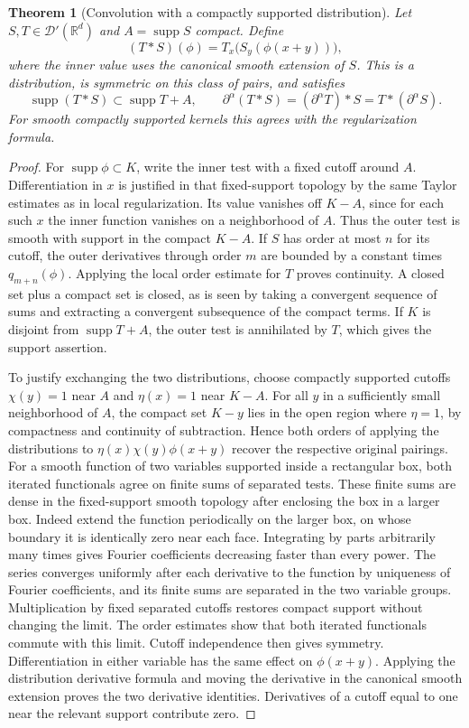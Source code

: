 \documentclass[11pt,oneside,openany]{book}
\newtheorem{theorem}{Theorem}[chapter]
\theoremstyle{definition}
\theoremstyle{remark}
\begin{document}
\begin{theorem}[Convolution with a compactly supported distribution]
\label{p102:U4-04}
Let \(S,T\in\mathcal D'(\mathbb R^d)\) and \(A=\operatorname{supp}S\) compact. Define
\[
 (T*S)(\phi)=T_x\bigl(S_y(\phi(x+y))\bigr),
\]
where the inner value uses the canonical smooth extension of \(S\). This is a distribution, is symmetric on this class of pairs, and satisfies
\[
 \operatorname{supp}(T*S)\subset \operatorname{supp}T+A,\qquad
 \partial^\alpha(T*S)=(\partial^\alpha T)*S=T*(\partial^\alpha S).
\]
For smooth compactly supported kernels this agrees with the regularization formula.
\end{theorem}
\begin{proof}
For \(\operatorname{supp}\phi\subset K\), write the inner test with a fixed cutoff around \(A\). Differentiation in \(x\) is justified in that fixed-support topology by the same Taylor estimates as in local regularization. Its value vanishes off \(K-A\), since for each such \(x\) the inner function vanishes on a neighborhood of \(A\). Thus the outer test is smooth with support in the compact \(K-A\). If \(S\) has order at most \(n\) for its cutoff, the outer derivatives through order \(m\) are bounded by a constant times \(q_{m+n}(\phi)\). Applying the local order estimate for \(T\) proves continuity. A closed set plus a compact set is closed, as is seen by taking a convergent sequence of sums and extracting a convergent subsequence of the compact terms. If \(K\) is disjoint from \(\operatorname{supp}T+A\), the outer test is annihilated by \(T\), which gives the support assertion.

To justify exchanging the two distributions, choose compactly supported cutoffs \(\chi(y)=1\) near \(A\) and \(\eta(x)=1\) near \(K-A\). For all \(y\) in a sufficiently small neighborhood of \(A\), the compact set \(K-y\) lies in the open region where \(\eta=1\), by compactness and continuity of subtraction. Hence both orders of applying the distributions to \(\eta(x)\chi(y)\phi(x+y)\) recover the respective original pairings. For a smooth function of two variables supported inside a rectangular box, both iterated functionals agree on finite sums of separated tests. These finite sums are dense in the fixed-support smooth topology after enclosing the box in a larger box. Indeed extend the function periodically on the larger box, on whose boundary it is identically zero near each face. Integrating by parts arbitrarily many times gives Fourier coefficients decreasing faster than every power. The series converges uniformly after each derivative to the function by uniqueness of Fourier coefficients, and its finite sums are separated in the two variable groups. Multiplication by fixed separated cutoffs restores compact support without changing the limit. The order estimates show that both iterated functionals commute with this limit. Cutoff independence then gives symmetry. Differentiation in either variable has the same effect on \(\phi(x+y)\). Applying the distribution derivative formula and moving the derivative in the canonical smooth extension proves the two derivative identities. Derivatives of a cutoff equal to one near the relevant support contribute zero.


\end{proof}
\end{document}
